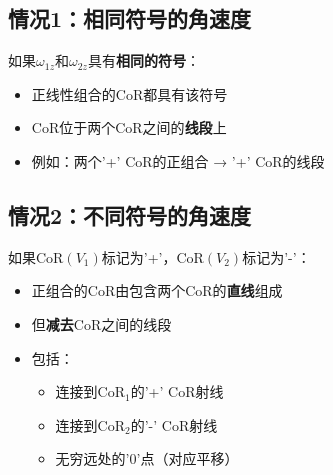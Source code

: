 \documentclass[12pt,a4paper]{article}
\begin{document}
\subsection{情况1：相同符号的角速度}

如果$\omega_{1z}$和$\omega_{2z}$具有\textbf{相同的符号}：

\begin{itemize}
\item 正线性组合的CoR都具有该符号
\item CoR位于两个CoR之间的\textbf{线段}上
\item 例如：两个'+' CoR的正组合 → '+' CoR的线段
\end{itemize}

\begin{center}
\end{center}

\subsection{情况2：不同符号的角速度}

如果$\text{CoR}(V_1)$标记为'+'，$\text{CoR}(V_2)$标记为'-'：

\begin{itemize}
\item 正组合的CoR由包含两个CoR的\textbf{直线}组成
\item 但\textbf{减去}CoR之间的线段
\item 包括：
  \begin{itemize}
  \item 连接到CoR$_1$的'+' CoR射线
  \item 连接到CoR$_2$的'-' CoR射线
  \item 无穷远处的'0'点（对应平移）
  \end{itemize}
\end{itemize}
\end{document}
